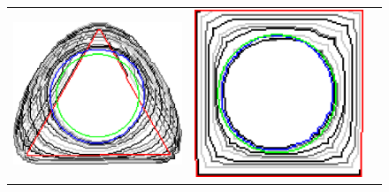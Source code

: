 \begin{figure}[]
\center
\begin{tabular}{ccc}
\includegraphics[scale=0.25]{figures/chapter5/flow/triangle/radius_5/ii/selastica/len_pen_0.01000/jonctions_1/best/gs_0.25000/summary.pdf} &
\includegraphics[scale=0.25]{figures/chapter5/flow/square/radius_5/ii/selastica/len_pen_0.01000/jonctions_1/best/gs_0.25000/summary.pdf} &

\end{tabular}
\end{figure}
